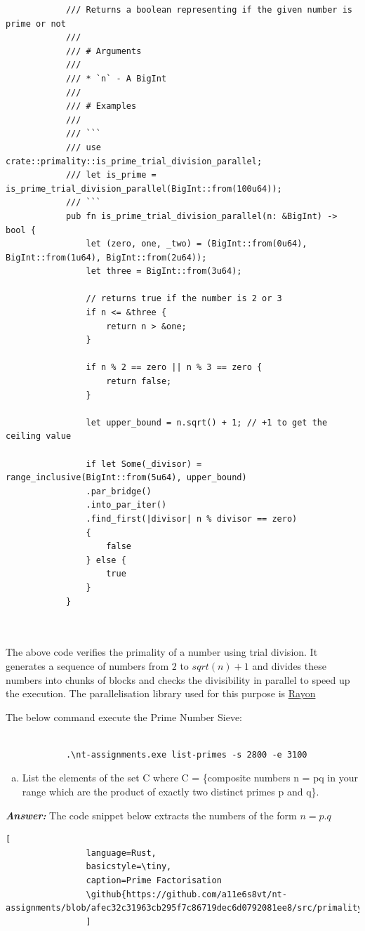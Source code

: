 \documentclass[11pt,a4paper]{article}
\newcommand{\github}[1]{%
	\href{#1}{\faGithubSquare}%
}
\begin{document}
\begin{enumerate}[1.]
\begin{flushleft}
\begin{lstlisting}
			/// Returns a boolean representing if the given number is prime or not
			///
			/// # Arguments
			///
			/// * `n` - A BigInt
			///
			/// # Examples
			///
			/// ```
			/// use crate::primality::is_prime_trial_division_parallel;
			/// let is_prime = is_prime_trial_division_parallel(BigInt::from(100u64));
			/// ```
			pub fn is_prime_trial_division_parallel(n: &BigInt) -> bool {
				let (zero, one, _two) = (BigInt::from(0u64), BigInt::from(1u64), BigInt::from(2u64));
				let three = BigInt::from(3u64);
				
				// returns true if the number is 2 or 3
				if n <= &three {
					return n > &one;
				}
				
				if n % 2 == zero || n % 3 == zero {
					return false;
				}
				
				let upper_bound = n.sqrt() + 1; // +1 to get the ceiling value
				
				if let Some(_divisor) = range_inclusive(BigInt::from(5u64), upper_bound)
				.par_bridge()
				.into_par_iter()
				.find_first(|divisor| n % divisor == zero)
				{
					false
				} else {
					true
				}
			}

			
			\end{lstlisting}

			The above code verifies the primality of a number using trial division. It generates a sequence of numbers from $2$ to $sqrt(n) + 1$ and divides these numbers into chunks of blocks and checks the divisibility in parallel to speed up the execution. The parallelisation library used for this purpose is \href{https://crates.io/crates/rayon}{Rayon}
			
			\bigbreak
			The below command execute the Prime Number Sieve:
			\begin{lstlisting}[style=DOS, caption=Example command - Prime Number Sieve]

			.\nt-assignments.exe list-primes -s 2800 -e 3100
			\end{lstlisting}
		\end{flushleft}
		
		\begin{enumerate}[(b)]
			\item List the elements of the set C where C = \{composite numbers n = pq in your range which are the product of exactly two distinct primes p and q\}.
		\end{enumerate}
		\begin{flushleft}
			\textbf{\textit{Answer:}} The code snippet below extracts the numbers of the form $n = p.q$
			\begin{lstlisting}[
				language=Rust, 
				basicstyle=\tiny, 
				caption=Prime Factorisation
				\github{https://github.com/a11e6s8vt/nt-assignments/blob/afec32c31963cb295f7c86719dec6d0792081ee8/src/primality.rs\#L57}        
				]
				

\end{lstlisting}
\end{flushleft}
\end{enumerate}
\end{document}
